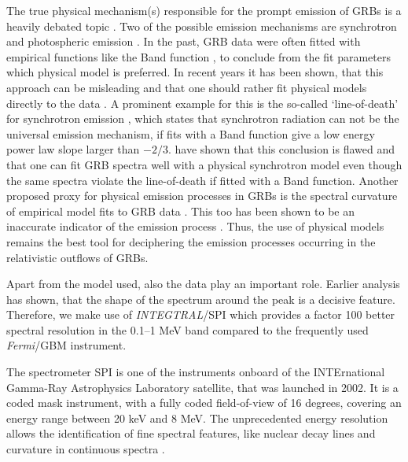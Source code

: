 \documentclass[twocolumn,traditabstract]{aa}
\begin{document}
The true physical mechanism(s) responsible for the prompt emission of GRBs is a heavily debated topic \citep[for a review see][]{KumarZhang2015}. %
Two of the possible emission mechanisms are synchrotron \citep[e.g.][]{syn_shell, bosnjak_syn, synch} and photospheric emission \citep[e.g.][]{Goodman1986, photo_1, photo_2, photo_3}. In the past, GRB data were often fitted with empirical functions like the Band function \citep{band}, to conclude from the fit parameters which physical model is preferred. In recent years it has been shown, that this approach can be misleading and that one should rather fit physical models directly to the data \citep{Burgess-2014, physical_models, synch}. A prominent example for this is the so-called `line-of-death' for synchrotron emission \citep{line-of-death, line-of-death2}, which states that synchrotron radiation can not be the universal emission mechanism, if fits with a Band function give a low energy power law slope larger than $-2/3$. \citet{synch} have shown that this conclusion is flawed and that one can fit GRB spectra well with a physical synchrotron model even though the same spectra violate the line-of-death if fitted with a Band function. Another proposed proxy for physical emission processes in GRBs is the spectral curvature of empirical model fits to GRB data \citep{Yu-2015, Axelsson-2015}. This too has been shown to be an inaccurate indicator of the emission process \citep{Burgess2019}. Thus, the use of physical models remains the best tool for deciphering the emission processes occurring in the relativistic outflows of GRBs.

Apart from the model used, also the data play an important role. Earlier analysis has shown, that the shape of the spectrum around the peak is a decisive feature. Therefore, we make use of \textit{INTEGTRAL}/SPI which provides a factor 100 better spectral resolution in the 0.1--1 MeV band compared to the frequently used \textit{Fermi}/GBM instrument.

The spectrometer SPI \citep{spi_main} is one of the instruments onboard of the INTErnational Gamma-Ray Astrophysics Laboratory \citep[\textit{INTEGRAL};][]{integral} satellite, that was launched in 2002. It is a coded mask instrument, with a fully coded field-of-view of 16 degrees, covering an energy range between 20 keV and 8 MeV. The unprecedented energy resolution allows the identification of fine spectral features, like nuclear decay lines \citep{Roques-2003, Diehl-2006} and curvature in continuous spectra \citep{Jourdain-2020}.
\end{document}
